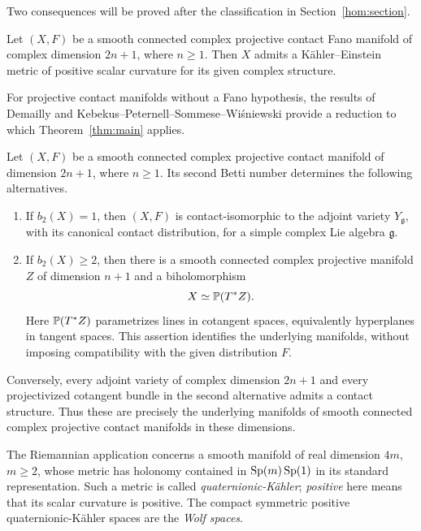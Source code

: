 Two consequences will be proved after the classification in
Section~\ref{hom:section}.

\begin{corollary}\label{thm:contact-fano-ke}
Let $(X,F)$ be a smooth connected complex projective contact Fano
manifold of complex dimension $2n+1$, where $n\geq1$. Then $X$ admits a
K\"ahler--Einstein metric of positive scalar curvature for its given
complex structure.
\end{corollary}

For projective contact manifolds without a Fano hypothesis, the
results of Demailly and Kebekus--Peternell--Sommese--Wi\'sniewski
provide a reduction to which Theorem~\ref{thm:main} applies.

\begin{corollary}\label{thm:projective-contact}
Let $(X,F)$ be a smooth connected complex projective contact manifold
of dimension $2n+1$, where $n\geq1$. Its second Betti number determines
the following alternatives.
\begin{enumerate}
\item If $b_2(X)=1$, then $(X,F)$ is contact-isomorphic to the adjoint
variety $Y_{\mathfrak g}$, with its canonical contact distribution, for
a simple complex Lie algebra $\mathfrak g$.
\item If $b_2(X)\geq2$, then there is a smooth connected complex
projective manifold $Z$ of dimension $n+1$ and a biholomorphism
\[
 X\simeq\mathbb P(T^*Z).
\]
Here $\mathbb P(T^*Z)$ parametrizes lines in cotangent spaces, equivalently
hyperplanes in tangent spaces. This assertion identifies the underlying
manifolds, without imposing compatibility with the given distribution $F$.
\end{enumerate}
Conversely, every adjoint variety of complex dimension $2n+1$ and every
projectivized cotangent bundle in the second alternative admits a contact
structure. Thus these are precisely the underlying manifolds of smooth
connected complex projective contact manifolds in these dimensions.
\end{corollary}

The Riemannian application concerns a smooth manifold of real
dimension $4m$, $m\geq2$, whose metric has holonomy contained in
$\operatorname{Sp}(m)\operatorname{Sp}(1)$ in its standard representation. Such a metric is
called \emph{quaternionic-K\"ahler}; \emph{positive} here means that
its scalar curvature is positive. The compact symmetric positive
quaternionic-K\"ahler spaces are the \emph{Wolf spaces}.


